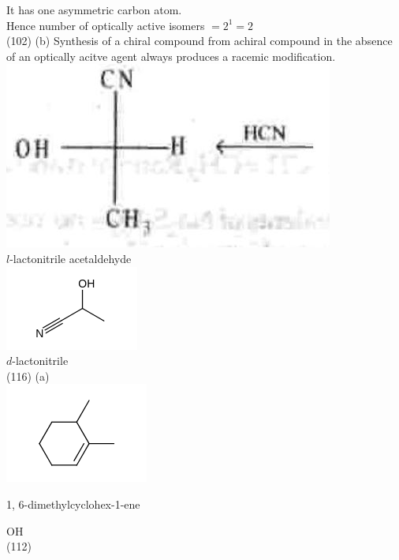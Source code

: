 \documentclass[10pt]{article}
\begin{document}
It has one asymmetric carbon atom.\\
Hence number of optically active isomers $=2^{1}=2$\\
(102) (b) Synthesis of a chiral compound from achiral compound in the absence of an optically acitve agent always produces a racemic modification.\\
\includegraphics[max width=\textwidth, center]{2025_01_28_8470952b98110cec3aabg-161(1)}\\
$l$-lactonitrile acetaldehyde\\
\includegraphics{smile-568692e54b44d918f31feea4aeb8b0a5042113a4}\\
$d$-lactonitrile\\
(116) (a)\\
\includegraphics{smile-fb8eac468d121021a85716752cb81b5d0dc6410f}

1, 6-dimethylcyclohex-1-ene

OH\\
(112)
\end{document}

